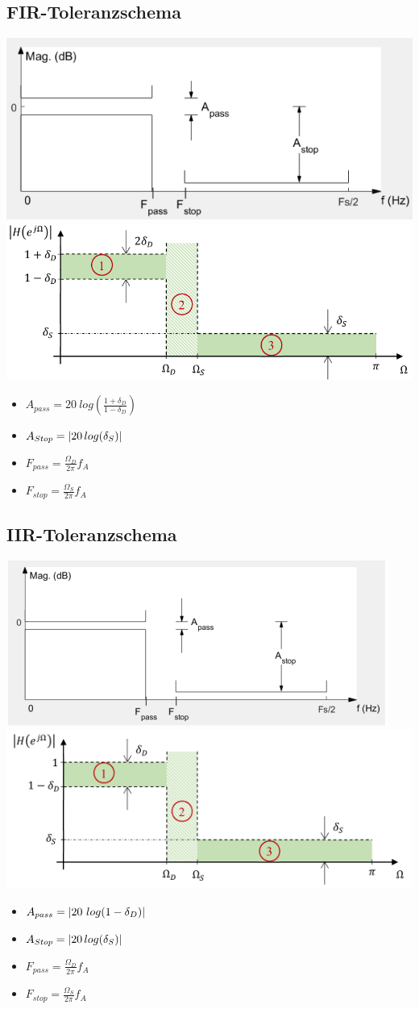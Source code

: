 \documentclass[10pt,a4paper]{article}
\begin{document}
\subsection{FIR-Toleranzschema}
  \begin{center}
      \includegraphics[width=.2\textwidth]{./img/toleranzschema1.png}
      \includegraphics[width=.25\textwidth]{./img/toleranzschema.png}
  \end{center}
\begin{itemize}
    \item $A_{pass}=20~log\left(\textstyle{\frac{1+\delta_{D}}{1-\delta_{D}}}\right)$
    \item $A_{Stop}=\abs{20\,log(\delta_{S})}$
    \item $F_{pass}=\frac{\Omega_{D}}{2\pi}f_{A}$
    \item $F_{stop}=\frac{\Omega_{S}}{2\pi}f_{A}$
\end{itemize}

\subsection{IIR-Toleranzschema}
  \begin{center}
      \includegraphics[width=.2\textwidth]{./img/iirtyp2.png}
      \includegraphics[width=.2\textwidth]{./img/iirtyp1.png}
  \end{center}
\begin{itemize}
    \item $A_{pass}=\abs{ 20~log(1-\delta_{D}) }$
    \item $A_{Stop}=\abs{20\,log(\delta_{S})}$
    \item $F_{pass}=\frac{\Omega_{D}}{2\pi}f_{A}$
    \item $F_{stop}=\frac{\Omega_{S}}{2\pi}f_{A}$
\end{itemize}
\end{document}
